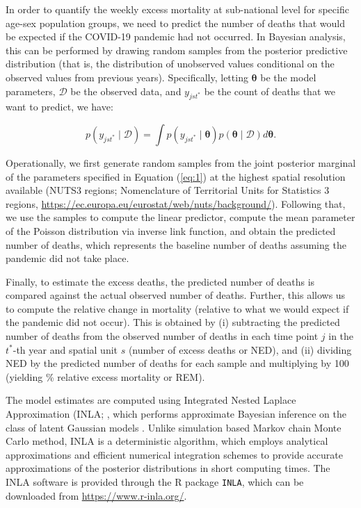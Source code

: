In order to quantify the weekly excess mortality at sub-national level for specific age-sex population groups, we need to predict the number of deaths that would be expected if the COVID-19 pandemic had not occurred. In Bayesian analysis, this can be performed by drawing random samples from the posterior predictive distribution (that is, the distribution of unobserved values conditional on the observed values from previous years). Specifically, letting $\pmb{\theta}$ be the model parameters, $\mathcal{D}$ be the observed data, and $y_{jst^{*}}$ be the count of deaths that we want to predict, we have:

\begin{equation}\label{eq:2}
p(y_{jst^{*}}\mid \mathcal{D}) = \int p(y_{jst^{*}}\mid\pmb{\theta}) p(\pmb{\theta}\mid\mathcal{D})d\pmb{\theta}.
\end{equation}

Operationally, we first generate random samples from the joint posterior marginal of the parameters specified in Equation (\ref{eq:1}) at the highest spatial resolution available (NUTS3 regions; Nomenclature of Territorial Units for Statistics 3 regions, \url{https://ec.europa.eu/eurostat/web/nuts/background/}). Following that, we use the samples to compute the linear predictor, compute the mean parameter of the Poisson distribution via inverse link function, and obtain the predicted number of deaths, which represents the baseline number of deaths assuming the pandemic did not take place. 

Finally, to estimate the excess deaths, the predicted number of deaths is compared against the actual observed number of deaths. Further, this allows us to compute the relative change in mortality (relative to what we would expect if the pandemic did not occur). This is obtained by (i) subtracting the predicted number of deaths from the observed number of deaths in each time point $j$ in the  $t^*$-th year and spatial unit $s$ (number of excess deaths or NED), and (ii) dividing NED by the predicted number of deaths for each sample and multiplying by 100 (yielding \% relative excess mortality or REM).

The model estimates are computed using Integrated Nested Laplace Approximation (INLA; \citealp{rue2009approximate}, which performs approximate Bayesian inference on the class of latent Gaussian models \citep{rue2005gaussian}. Unlike simulation based Markov chain Monte Carlo method, INLA is a deterministic algorithm, which employs analytical approximations and efficient numerical integration schemes to provide accurate approximations of the posterior distributions in short computing times. The INLA software is provided through the R package \texttt{INLA}, which can be downloaded from \url{https://www.r-inla.org/}. 

